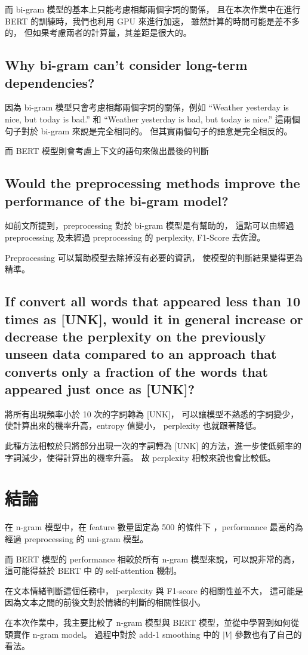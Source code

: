 \documentclass{article}[12pt]
\begin{document}
而 bi-gram 模型的基本上只能考慮相鄰兩個字詞的關係，
且在本次作業中在進行 BERT 的訓練時，我們也利用 GPU 來進行加速，
雖然計算的時間可能是差不多的，
但如果考慮兩者的計算量，其差距是很大的。

\subsection{Why bi-gram can't consider long-term dependencies?}

因為 bi-gram 模型只會考慮相鄰兩個字詞的關係，例如 ``Weather yesterday is nice, but today is bad.'' 和
``Weather yesterday is bad, but today is nice.'' 這兩個句子對於 bi-gram 來說是完全相同的。
但其實兩個句子的語意是完全相反的。

而 BERT 模型則會考慮上下文的語句來做出最後的判斷

\subsection{Would the preprocessing methods improve the performance of the bi-gram model?}

如前文所提到，preprocessing 對於 bi-gram 模型是有幫助的，
這點可以由經過 preprocessing 及未經過 preprocessing 的 perplexity, F1-Score 去佐證。

Preprocessing 可以幫助模型去除掉沒有必要的資訊，
使模型的判斷結果變得更為精準。

\subsection{If convert all words that appeared less than 10 times as [UNK], would it in general
increase or decrease the perplexity on the previously unseen data
compared to an approach that converts only a fraction of the words that
appeared just once as [UNK]?}

將所有出現頻率小於 10 次的字詞轉為 [UNK]， 可以讓模型不熟悉的字詞變少，使計算出來的機率升高，entropy 值變小，
perplexity 也就跟著降低。

此種方法相較於只將部分出現一次的字詞轉為 [UNK] 的方法，進一步使低頻率的字詞減少，使得計算出的機率升高。
故 perplexity 相較來說也會比較低。


\section{結論}

在 n-gram 模型中，在 feature 數量固定為 500 的條件下
，performance 最高的為經過 preprocessing 的 uni-gram 模型。

而 BERT 模型的 performance 相較於所有 n-gram 模型來說，可以說非常的高，這可能得益於 BERT 中
的 self-attention 機制。

在文本情緒判斷這個任務中， perplexity 與 F1-score 的相關性並不大，
這可能是因為文本之間的前後文對於情緒的判斷的相關性很小。

在本次作業中，我主要比較了 n-gram 模型與 BERT 模型，並從中學習到如何從頭實作 n-gram model。
過程中對於 add-1 smoothing 中的 $|V|$ 參數也有了自己的看法。
\end{document}
